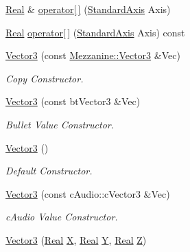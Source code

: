 \begin{DoxyCompactItemize}
\item 
\hyperlink{namespaceMezzanine_a726731b1a7df72bf3583e4a97282c6f6}{Real} \& \hyperlink{classMezzanine_1_1Vector3_a5d05984d0b61a2e86449c0edd33ff301}{operator\mbox{[}$\,$\mbox{]}} (\hyperlink{namespaceMezzanine_ab41a00a8c6a47b576dc987ec34e16ba1}{StandardAxis} Axis)
\item 
\hyperlink{namespaceMezzanine_a726731b1a7df72bf3583e4a97282c6f6}{Real} \hyperlink{classMezzanine_1_1Vector3_a4f11de32d30935c57ddc033b334aa42c}{operator\mbox{[}$\,$\mbox{]}} (\hyperlink{namespaceMezzanine_ab41a00a8c6a47b576dc987ec34e16ba1}{StandardAxis} Axis) const 
\item 
\hyperlink{classMezzanine_1_1Vector3_a778d067a1845e7b5fd0a1751c3187901}{Vector3} (const \hyperlink{classMezzanine_1_1Vector3}{Mezzanine::Vector3} \&Vec)
\begin{DoxyCompactList}\small\item\em Copy Constructor. \item\end{DoxyCompactList}\item 
\hyperlink{classMezzanine_1_1Vector3_a98311dcd61c647fbe0285ba3cef00164}{Vector3} (const btVector3 \&Vec)
\begin{DoxyCompactList}\small\item\em Bullet Value Constructor. \item\end{DoxyCompactList}\item 
\hyperlink{classMezzanine_1_1Vector3_a55ef98afbd1e780c6d7dabf0ef7d006f}{Vector3} ()
\begin{DoxyCompactList}\small\item\em Default Constructor. \item\end{DoxyCompactList}\item 
\hyperlink{classMezzanine_1_1Vector3_ab6478bd78241583b76a112b6d2c4008f}{Vector3} (const cAudio::cVector3 \&Vec)
\begin{DoxyCompactList}\small\item\em cAudio Value Constructor. \item\end{DoxyCompactList}\item 
\hyperlink{classMezzanine_1_1Vector3_ac17ce0e1ce601a731abce0f6927e316d}{Vector3} (\hyperlink{namespaceMezzanine_a726731b1a7df72bf3583e4a97282c6f6}{Real} \hyperlink{classMezzanine_1_1Vector3_aa858d9bc5ac5ad1b685b7088c94c05f6}{X}, \hyperlink{namespaceMezzanine_a726731b1a7df72bf3583e4a97282c6f6}{Real} \hyperlink{classMezzanine_1_1Vector3_a2303527e4ea4cd1659a23320627cd62c}{Y}, \hyperlink{namespaceMezzanine_a726731b1a7df72bf3583e4a97282c6f6}{Real} \hyperlink{classMezzanine_1_1Vector3_a9b887faced986921956f20f3e4cb8ddc}{Z})

\end{DoxyCompactItemize}

